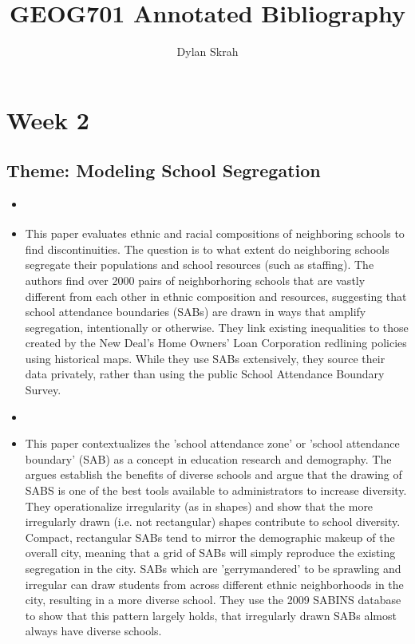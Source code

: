 \documentclass{article}
\begin{document}
\title{GEOG701 Annotated Bibliography}
\author{Dylan Skrah}

\maketitle

\section{Week 2}
\subsection{Theme: Modeling School Segregation}
\begin{itemize}

\item \cite{monarrez2021RaciallyUnequal}
\subitem
\item This paper evaluates ethnic and racial compositions of neighboring schools to find discontinuities. The question is to what extent do neighboring schools segregate their populations and school resources (such as staffing). The authors find over 2000 pairs of neighborhoring schools that are vastly different from each other in ethnic composition and resources, suggesting that school attendance boundaries (SABs) are drawn in ways that amplify segregation, intentionally or otherwise. They link existing inequalities to those created by the New Deal's Home Owners' Loan Corporation redlining policies using historical maps. While they use SABs extensively, they source their data privately, rather than using the public School Attendance Boundary Survey.

\item \cite{saporito2016IrregularlyShaped}
\item This paper contextualizes the 'school attendance zone' or 'school attendance boundary' (SAB) as a concept in education research and demography. The argues establish the benefits of diverse schools and argue that the drawing of SABS is one of the best tools available to administrators to increase diversity. They operationalize irregularity (as in shapes) and show that the more irregularly drawn (i.e. not rectangular) shapes contribute to school diversity. Compact, rectangular SABs tend to mirror the demographic makeup of the overall city, meaning that a grid of SABs will simply reproduce the existing segregation in the city. SABs which are 'gerrymandered' to be sprawling and irregular can draw students from across different ethnic neighborhoods in the city, resulting in a more diverse school. They use the 2009 SABINS database to show that this pattern largely holds, that irregularly drawn SABs almost always have diverse schools.

\end{itemize}
\end{document}

